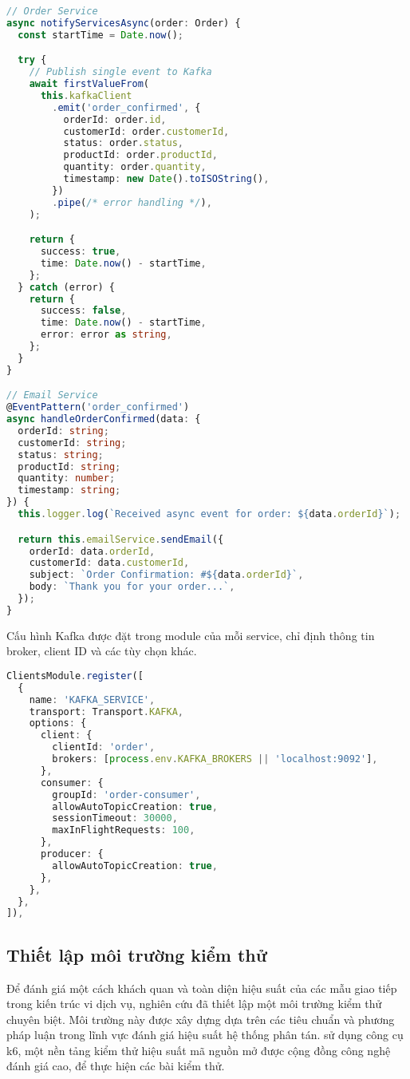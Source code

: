 \begin{lstlisting}[language=Typescript]
// Order Service
async notifyServicesAsync(order: Order) {
  const startTime = Date.now();

  try {
    // Publish single event to Kafka
    await firstValueFrom(
      this.kafkaClient
        .emit('order_confirmed', {
          orderId: order.id,
          customerId: order.customerId,
          status: order.status,
          productId: order.productId,
          quantity: order.quantity,
          timestamp: new Date().toISOString(),
        })
        .pipe(/* error handling */),
    );

    return {
      success: true,
      time: Date.now() - startTime,
    };
  } catch (error) {
    return {
      success: false,
      time: Date.now() - startTime,
      error: error as string,
    };
  }
}

// Email Service
@EventPattern('order_confirmed')
async handleOrderConfirmed(data: {
  orderId: string;
  customerId: string;
  status: string;
  productId: string;
  quantity: number;
  timestamp: string;
}) {
  this.logger.log(`Received async event for order: ${data.orderId}`);

  return this.emailService.sendEmail({
    orderId: data.orderId,
    customerId: data.customerId,
    subject: `Order Confirmation: #${data.orderId}`,
    body: `Thank you for your order...`,
  });
}
\end{lstlisting}

Cấu hình Kafka được đặt trong module của mỗi service, chỉ định thông tin broker, client ID và các tùy chọn khác.

\begin{lstlisting}[language=Typescript]
ClientsModule.register([
  {
    name: 'KAFKA_SERVICE',
    transport: Transport.KAFKA,
    options: {
      client: {
        clientId: 'order',
        brokers: [process.env.KAFKA_BROKERS || 'localhost:9092'],
      },
      consumer: {
        groupId: 'order-consumer',
        allowAutoTopicCreation: true,
        sessionTimeout: 30000,
        maxInFlightRequests: 100,
      },
      producer: {
        allowAutoTopicCreation: true,
      },
    },
  },
]),
\end{lstlisting}

\subsection{Thiết lập môi trường kiểm thử}
Để đánh giá một cách khách quan và toàn diện hiệu suất của các mẫu giao tiếp trong kiến trúc vi dịch vụ, nghiên cứu đã thiết lập một môi trường kiểm thử chuyên biệt. Môi trường này được xây dựng dựa trên các tiêu chuẩn và phương pháp luận trong lĩnh vực đánh giá hiệu suất hệ thống phân tán. sử dụng công cụ k6, một nền tảng kiểm thử hiệu suất mã nguồn mở được cộng đồng công nghệ đánh giá cao, để thực hiện các bài kiểm thử.

